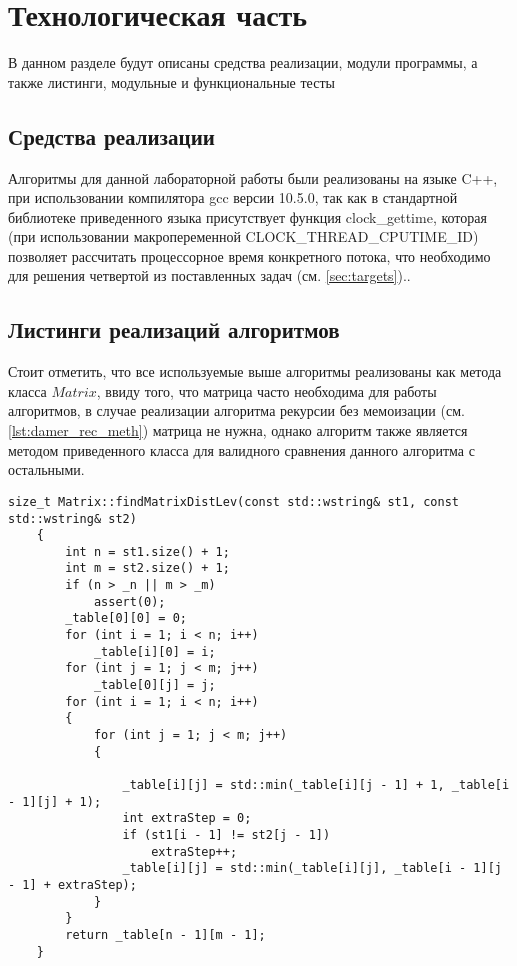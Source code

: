 \chapter{Технологическая часть}
В данном разделе будут описаны средства реализации, модули программы, а также листинги, модульные и функциональные тесты
\section{Средства реализации}
Алгоритмы для данной лабораторной работы были реализованы на языке C++, при использовании компилятора gcc версии 10.5.0, так как в стандартной библиотеке приведенного языка
присутствует функция clock\_gettime, которая (при использовании макропеременной CLOCK\_THREAD\_CPUTIME\_ID) позволяет рассчитать процессорное время конкретного потока, 
что необходимо для решения четвертой из  поставленных задач (см. \ref{sec:targets}).\cite{cpp-time}.



\section{Листинги реализаций алгоритмов}

Стоит отметить, что все используемые выше алгоритмы реализованы как метода класса $Matrix$, ввиду того, что матрица
часто необходима для работы алгоритмов, в случае реализации алгоритма рекурсии без мемоизации (см. \ref{lst:damer_rec_meth}) матрица не нужна, однако 
алгоритм также является методом приведенного класса для валидного сравнения данного алгоритма с остальными.

\begin{lstlisting}[label=lst:lev_matr,caption=Метод нахождения расстояния Левенштейна с использованием матрицы]
    size_t Matrix::findMatrixDistLev(const std::wstring& st1, const std::wstring& st2)
    {
        int n = st1.size() + 1;
        int m = st2.size() + 1;
        if (n > _n || m > _m)
            assert(0);
        _table[0][0] = 0;
        for (int i = 1; i < n; i++)
            _table[i][0] = i;
        for (int j = 1; j < m; j++)
            _table[0][j] = j;
        for (int i = 1; i < n; i++)
        {
            for (int j = 1; j < m; j++)
            {
    
                _table[i][j] = std::min(_table[i][j - 1] + 1, _table[i - 1][j] + 1);
                int extraStep = 0;
                if (st1[i - 1] != st2[j - 1])
                    extraStep++;
                _table[i][j] = std::min(_table[i][j], _table[i - 1][j - 1] + extraStep);
            }
        }
        return _table[n - 1][m - 1];
    }
\end{lstlisting}

